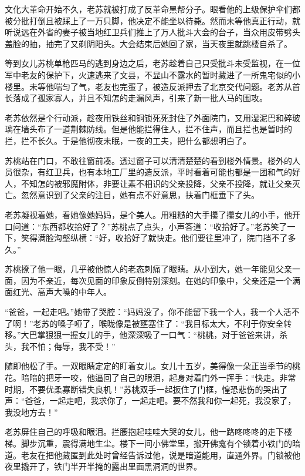 文化大革命开始不久，老苏就被打成了反革命黑帮分子。眼看他的上级保护伞们都被分批打倒且被踩上了一万只脚，他决定不能坐以待毙。然而未等他真正行动，就听说远在外省的妻子被当地红卫兵们推上了万人批斗大会的台子，当众用皮带劈头盖脸的抽，抽完了又剃阴阳头。大会结束后她回了家，当天夜里就跳楼自杀了。

等到女儿苏桃单枪匹马的逃到身边之后，老苏趁着自己只受批斗未受监视，在一位军中老友的保护下，火速逃来了文县，不显山不露水的暂时藏进了一所鬼宅似的小楼里。未等他喘匀了气，老友也完蛋了，被造反派押去了北京交代问题。老苏从首长落成了孤家寡人，并且不知怎的走漏风声，引来了新一批人马的围攻。

老苏依然是个行动派，趁夜用铁丝和铜锁死死封住了外面院门，又用湿泥巴和碎玻璃在墙头布了一道荆棘防线。但是他能拦得住人，拦不住声，而且拦也是暂时的拦，拦不长久。于是他彻夜未眠，一夜的工夫，把什么都想明白了。

苏桃站在门口，不敢往窗前凑。透过窗子可以清清楚楚的看到楼外情景。楼外的人员很杂，有红卫兵，也有本地工厂里的造反派，平时看着可能也都是一团和气的好人，不知怎的被邪魔附体，非要让素不相识的父亲投降，父亲不投降，就让父亲灭亡。忽然意识到了父亲的注目，她有点不好意思，扶着门框垂下了头。

老苏凝视着她，看她像她妈妈，是个美人。用粗糙的大手攥了攥女儿的小手，他开口问道：``东西都收拾好了？''苏桃点了点头，小声答道：``收拾好了。''老苏笑了一下，笑得满脸沟壑纵横：``好，收拾好了就快走。他们要往里冲了，院门挡不了多久。''

苏桃撩了他一眼，几乎被他惊人的老态刺痛了眼睛。从小到大，她一年能见父亲一面，因为不亲近，每次见面的印象反倒特别深刻。在她的印象中，父亲还是一个满面红光、高声大嗓的中年人。

``爸爸，一起走吧。''她带了哭腔：``妈妈没了，你不能留下我一个人，我一个人活不了啊！''老苏的嗓子哑了，喉咙像是被壅塞住了：``我目标太大，不利于你安全转移。''大巴掌狠狠一握女儿的手，他深深吸了一口气：``桃桃，对于爸爸来讲，杀头，我不怕；侮辱，我不受！''

随即他松了手。一双眼睛定定的盯着女儿。女儿十五岁，美得像一朵正当季节的桃花。暗暗的把牙一咬，他逼回了自己的眼泪，起身对着门外一挥手：``快走。非常时期，不要优柔寡断错失良机！''苏桃双手一起扳住了门框，惶恐悲伤的哭出了声：``爸爸，一起走吧，我求你了，一起走吧。要不然我和你一起死，我没家了，我没地方去！''

老苏屏住自己的呼吸和眼泪。拦腰抱起哇哇大哭的女儿，他一路咚咚咚的走下楼梯。脚步沉重，震得满地生尘。楼下一间小佛堂里，搬开佛龛有个锁着小铁门的暗道。老友在把他藏匿到此处时曾经告诉过他，说是暗道能用，直通外界。门锁被他夜里撬开了，铁门半开半掩的露出里面黑洞洞的世界。

